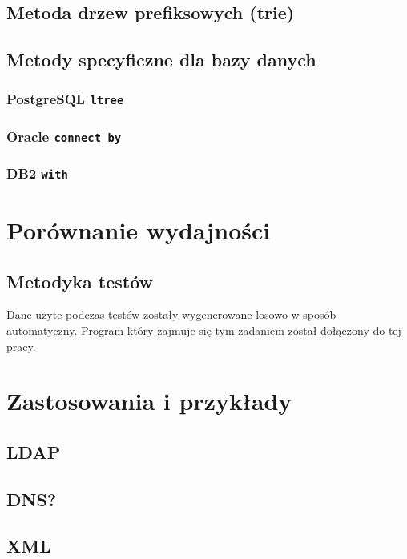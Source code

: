 \documentclass[10pt,a4paper,draft]{book}
\begin{document}
\section{Metoda drzew prefiksowych (trie)}

\section{Metody specyficzne dla bazy danych}
\subsection{PostgreSQL \texttt{ltree}}
\subsection{Oracle \texttt{connect by}}
\subsection{DB2 \texttt{with}}

\chapter{Porównanie wydajności}

\section{Metodyka testów}

Dane użyte podczas testów zostały wygenerowane losowo w sposób automatyczny. Program który zajmuje się tym zadaniem został dołączony do tej pracy.

\chapter{Zastosowania i przykłady}

\section{LDAP}
\section{DNS?}
\section{XML}
\subsection{}
\end{document}
